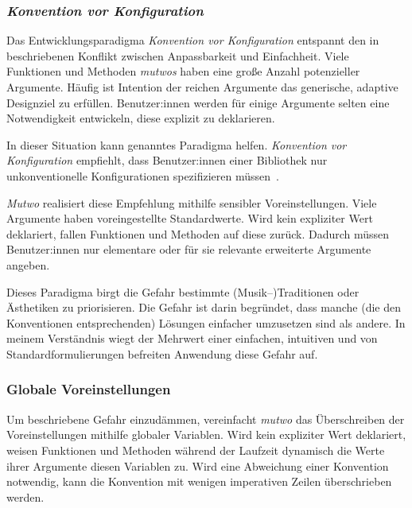 \documentclass[12pt,a4paper,ngerman]{article}
\begin{document}
\subsubsection{\emph{Konvention vor Konfiguration}}
\label{conventionOverConfiguration}

Das Entwicklungsparadigma \emph{Konvention vor Konfiguration} entspannt den in \emph{} beschriebenen Konflikt zwischen Anpassbarkeit und Einfachheit.
Viele Funktionen und Methoden \emph{mutwos} haben eine große Anzahl potenzieller Argumente.
Häufig ist Intention der reichen Argumente das generische, adaptive Designziel zu erfüllen.
Benutzer:innen werden für einige Argumente selten eine Notwendigkeit entwickeln, diese explizit zu deklarieren.

\bigskip

In dieser Situation kann genanntes Paradigma helfen.
\emph{Konvention vor Konfiguration} empfiehlt, dass Benutzer:innen einer Bibliothek nur unkonventionelle Konfigurationen spezifizieren müssen~\parencite{conventionOverConfiguration}.

\bigskip

\emph{Mutwo} realisiert diese Empfehlung mithilfe sensibler Voreinstellungen.
Viele Argumente haben voreingestellte Standardwerte.
Wird kein expliziter Wert deklariert, fallen Funktionen und Methoden auf diese zurück.
Dadurch müssen Benutzer:innen nur elementare oder für sie relevante erweiterte Argumente angeben.

\bigskip

Dieses Paradigma birgt die Gefahr bestimmte (Musik--)Traditionen oder Ästhetiken zu priorisieren.
Die Gefahr ist darin begründet, dass manche (die den Konventionen entsprechenden) Lösungen einfacher umzusetzen sind als andere.
In meinem Verständnis wiegt der Mehrwert einer einfachen, intuitiven und von Standardformulierungen befreiten Anwendung diese Gefahr auf.

\subsubsection{Globale Voreinstellungen}

Um beschriebene Gefahr einzudämmen, vereinfacht \emph{mutwo} das Überschreiben der Voreinstellungen mithilfe globaler Variablen.
Wird kein expliziter Wert deklariert, weisen Funktionen und Methoden während der Laufzeit dynamisch die Werte ihrer Argumente diesen Variablen zu.
Wird eine Abweichung einer Konvention notwendig, kann die Konvention mit wenigen imperativen Zeilen überschrieben werden.
\end{document}
